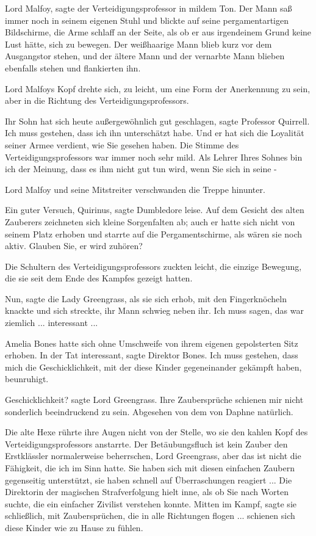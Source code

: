 \glqq Lord Malfoy\grqq{}, sagte der Verteidigungsprofessor in mildem Ton. Der
Mann saß immer noch in seinem eigenen Stuhl und blickte auf seine
pergamentartigen Bildschirme, die Arme schlaff an der Seite, als ob er aus
irgendeinem Grund keine Lust hätte, sich zu bewegen. Der weißhaarige Mann blieb
kurz vor dem Ausgangstor stehen, und der ältere Mann und der vernarbte Mann
blieben ebenfalls stehen und flankierten ihn.

Lord Malfoys Kopf drehte sich, zu leicht, um eine Form der Anerkennung zu sein,
aber in die Richtung des Verteidigungsprofessors.

\glqq Ihr Sohn hat sich heute außergewöhnlich gut geschlagen\grqq{}, sagte
Professor Quirrell. \glqq Ich muss gestehen, dass ich ihn unterschätzt habe. Und
er hat sich die Loyalität seiner Armee verdient, wie Sie gesehen haben.\grqq{}
Die Stimme des Verteidigungsprofessors war immer noch sehr mild. \glqq Als
Lehrer Ihres Sohnes bin ich der Meinung, dass es ihm nicht gut tun wird, wenn
Sie sich in seine -\grqq{}

Lord Malfoy und seine Mitstreiter verschwanden die Treppe hinunter.

\glqq Ein guter Versuch, Quirinus\grqq{}, sagte Dumbledore leise. Auf dem
Gesicht des alten Zauberers zeichneten sich kleine Sorgenfalten ab; auch er
hatte sich nicht von seinem Platz erhoben und starrte auf die Pergamentschirme,
als wären sie noch aktiv. \glqq Glauben Sie, er wird zuhören?\grqq{}

Die Schultern des Verteidigungsprofessors zuckten leicht, die einzige Bewegung,
die sie seit dem Ende des Kampfes gezeigt hatten.

\glqq Nun\grqq{}, sagte die Lady Greengrass, als sie sich erhob, mit den
Fingerknöcheln knackte und sich streckte, ihr Mann schwieg neben ihr. \glqq Ich
muss sagen, das war ziemlich ... interessant ...\grqq{}

Amelia Bones hatte sich ohne Umschweife von ihrem eigenen gepolsterten Sitz
erhoben. \glqq In der Tat interessant\grqq{}, sagte Direktor Bones. \glqq Ich
muss gestehen, dass mich die Geschicklichkeit, mit der diese Kinder
gegeneinander gekämpft haben, beunruhigt.\grqq{}

\glqq Geschicklichkeit?\grqq{} sagte Lord Greengrass. \glqq Ihre Zaubersprüche
schienen mir nicht sonderlich beeindruckend zu sein. Abgesehen von dem von
Daphne natürlich.\grqq{}

Die alte Hexe rührte ihre Augen nicht von der Stelle, wo sie den kahlen Kopf des
Verteidigungsprofessors anstarrte. \glqq Der Betäubungsfluch ist kein Zauber den
Erstklässler normalerweise beherrschen, Lord Greengrass, aber das ist nicht die
Fähigkeit, die ich im Sinn hatte. Sie haben sich mit diesen einfachen Zaubern
gegenseitig unterstützt, sie haben schnell auf Überraschungen reagiert
...\grqq{} Die Direktorin der magischen Strafverfolgung hielt inne, als ob Sie
nach Worten suchte, die ein einfacher Zivilist verstehen konnte. \glqq Mitten im
Kampf\grqq{}, sagte sie schließlich, \glqq mit Zaubersprüchen, die in alle
Richtungen flogen ... schienen sich diese Kinder wie zu Hause zu fühlen.\grqq{}

